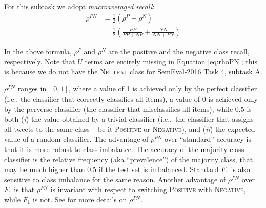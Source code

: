 \documentclass[11pt,letterpaper]{article}
\begin{document}
For this subtask we adopt
%
%
\emph{macroaveraged recall}:
%
\begin{equation}
  \begin{aligned}
    \label{eq:rhoPN}
    \rho^{PN} & = \frac{1}{2}(\rho^{P}+\rho^{N}) \\
    & =
    \frac{1}{2}(\displaystyle\frac{PP}{PP+NP}+\displaystyle\frac{NN}{NN+PN})
  \end{aligned}
\end{equation}
%

In the above formula, $\rho^{P}$ and $\rho^{N}$ are the positive and the negative class recall, respectively. Note that $U$ terms are entirely missing in Equation
\ref{eq:rhoPN}; this is because we do not have the \textsc{Neutral} class for SemEval-2016 Task 4, subtask A.

$\rho^{PN}$ ranges in $[0,1]$, where a value of 1 is achieved only by the perfect
classifier (i.e., the classifier that correctly classifies all items), a value of 0 is achieved only by the perverse classifier (the classifier that
misclassifies all items), while $0.5$ is both (\emph{i}) the value obtained
by a trivial classifier (i.e.,~the classifier that assigns all tweets
to the same class -- be it \textsc{Positive} or \textsc{Negative}),
and (\emph{ii}) the expected value of a random classifier. The advantage of
$\rho^{PN}$ over ``standard'' accuracy is that it is more robust to
class imbalance.  The accuracy of the
majority-class classifier is the relative frequency (aka
``prevalence'') of the majority class, that may be much higher than
0.5 if the test set is imbalanced.  Standard $F_{1}$ is also sensitive
to class imbalance for the same reason. Another advantage of
$\rho^{PN}$ over $F_{1}$ is that $\rho^{PN}$ is invariant with respect
to switching \textsc{Positive} with \textsc{Negative}, while $F_{1}$
is not.  See \cite{Sebastiani:2015zl} for more details on $\rho^{PN}$.
\end{document}
